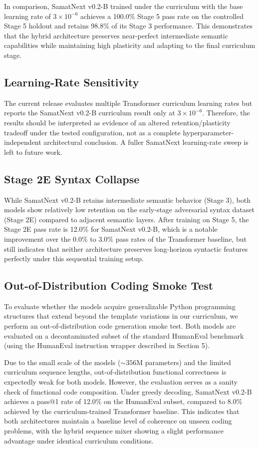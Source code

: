 \documentclass[11pt,a4paper]{article}
\begin{document}
In comparison, SamatNext v0.2-B trained under the curriculum with the base learning rate of $3\times 10^{-6}$ achieves a 100.0\% Stage 5 pass rate on the controlled Stage 5 holdout and retains 98.8\% of its Stage 3 performance. This demonstrates that the hybrid architecture preserves near-perfect intermediate semantic capabilities while maintaining high plasticity and adapting to the final curriculum stage.

\subsection{Learning-Rate Sensitivity}
The current release evaluates multiple Transformer curriculum learning rates but reports the SamatNext v0.2-B curriculum result only at $3\times 10^{-6}$. Therefore, the results should be interpreted as evidence of an altered retention/plasticity tradeoff under the tested configuration, not as a complete hyperparameter-independent architectural conclusion. A fuller SamatNext learning-rate sweep is left to future work.

\subsection{Stage 2E Syntax Collapse}
While SamatNext v0.2-B retains intermediate semantic behavior (Stage 3), both models show relatively low retention on the early-stage adversarial syntax dataset (Stage 2E) compared to adjacent semantic layers. After training on Stage 5, the Stage 2E pass rate is 12.0\% for SamatNext v0.2-B, which is a notable improvement over the 0.0\% to 3.0\% pass rates of the Transformer baseline, but still indicates that neither architecture preserves long-horizon syntactic features perfectly under this sequential training setup.

\subsection{Out-of-Distribution Coding Smoke Test}
To evaluate whether the models acquire generalizable Python programming structures that extend beyond the template variations in our curriculum, we perform an out-of-distribution code generation smoke test. Both models are evaluated on a decontaminated subset of the standard HumanEval benchmark (using the HumanEval instruction wrapper described in Section 5). 

Due to the small scale of the models ($\sim 356$M parameters) and the limited curriculum sequence lengths, out-of-distribution functional correctness is expectedly weak for both models. However, the evaluation serves as a sanity check of functional code composition. Under greedy decoding, SamatNext v0.2-B achieves a pass@1 rate of 12.0\% on the HumanEval subset, compared to 8.0\% achieved by the curriculum-trained Transformer baseline. This indicates that both architectures maintain a baseline level of coherence on unseen coding problems, with the hybrid sequence mixer showing a slight performance advantage under identical curriculum conditions.
\end{document}
